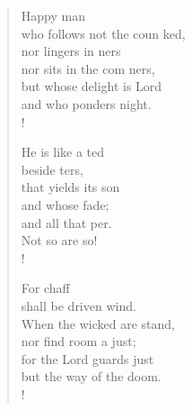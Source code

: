 \documentclass[10pt,a5paper,twoside]{report}
\begin{document}
\begin{flushleft}
\begin{verse}
 Happy    man\\
who follows not the coun   ked,\\
nor lingers in    ners\\
nor sits in the com  ners,\\
 but whose delight is     Lord\\
and who ponders     night.\\!

 He is like a    ted\\
beside   ters,\\
that yields its    son\\
and whose    fade;\\
and all that    per.\\
 Not so are    so!\\!

For    chaff\\
shall be driven    wind.\\
 When the wicked are     stand,\\
nor find room a    just;\\
 for the Lord guards     just\\
but the way of the    doom.\\!

\end{verse}
\end{flushleft}
\end{document}
